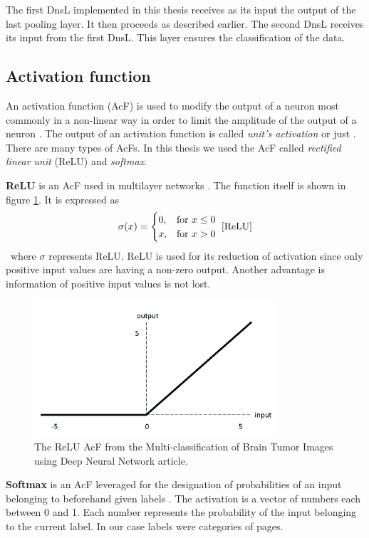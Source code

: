 The first DnsL implemented in this thesis receives as its input the output of the last pooling layer. It then proceeds as described earlier. The second DnsL receives its input from the first DnsL. This layer ensures the classification of the data.

\subsection{Activation function}\label{activationFunction}
An activation function (AcF) is used to modify the output of a neuron most commonly in a non-linear way in order to limit the amplitude of the output of a neuron \cite{activationFunction}. The output of an activation function is called \textit{unit's activation} or just . There are many types of AcFs. In this thesis we used the AcF called \textit{rectified linear unit} (ReLU) and \textit{softmax}.

\textbf{ReLU} is an AcF used in multilayer networks \cite{ReLU}. The function itself is shown in figure \ref{reluImage}. It is expressed as 
\[\sigma(x)= \begin{cases}
    0, & \text{for } x\leq 0\\
    x, & \text{for } x > 0
\end{cases}~\cite{ReLU}\] ~where $\sigma$ represents ReLU. ReLU is used for its reduction of activation since only positive input values are having a non-zero output. Another advantage is information of positive input values is not lost.
\begin{figure}[ht!]
  \centering
  \includegraphics[width=0.8\textwidth]{Images/ReLUFunction.png}
  \caption{The ReLU AcF from the Multi-classification of Brain Tumor Images using Deep Neural Network \cite{reluImage} article.} 
  \label{reluImage}
\end{figure} 

\textbf{Softmax} is an AcF leveraged for the designation of probabilities of an input belonging to beforehand given labels \cite{machineLeraningApproaches}. The activation is a vector of numbers each between 0 and 1. Each number represents the probability of the input belonging to the current label.  In our case labels were categories of pages.

